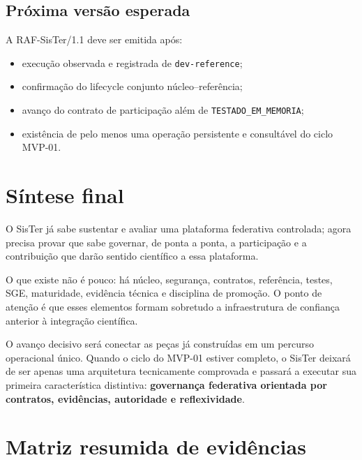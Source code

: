\documentclass[11pt,a4paper,oneside]{article}
\begin{document}
\subsection{Próxima versão esperada}

A RAF-SisTer/1.1 deve ser emitida após:

\begin{itemize}
  \item execução observada e registrada de \texttt{dev-reference};
  \item confirmação do lifecycle conjunto núcleo--referência;
  \item avanço do contrato de participação além de \texttt{TESTADO\_EM\_MEMORIA};
  \item existência de pelo menos uma operação persistente e consultável do ciclo MVP-01.
\end{itemize}

\section{Síntese final}

\begin{principio}
O SisTer já sabe sustentar e avaliar uma plataforma federativa controlada; agora precisa provar que sabe governar, de ponta a ponta, a participação e a contribuição que darão sentido científico a essa plataforma.
\end{principio}

O que existe não é pouco: há núcleo, segurança, contratos, referência, testes, SGE, maturidade, evidência técnica e disciplina de promoção. O ponto de atenção é que esses elementos formam sobretudo a infraestrutura de confiança anterior à integração científica.

O avanço decisivo será conectar as peças já construídas em um percurso operacional único. Quando o ciclo do MVP-01 estiver completo, o SisTer deixará de ser apenas uma arquitetura tecnicamente comprovada e passará a executar sua primeira característica distintiva: \textbf{governança federativa orientada por contratos, evidências, autoridade e reflexividade}.

\appendix
\section{Matriz resumida de evidências}
\end{document}
